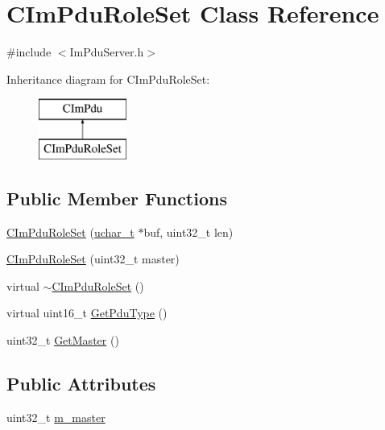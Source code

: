 \hypertarget{class_c_im_pdu_role_set}{}\section{C\+Im\+Pdu\+Role\+Set Class Reference}
\label{class_c_im_pdu_role_set}


{\ttfamily \#include $<$Im\+Pdu\+Server.\+h$>$}

Inheritance diagram for C\+Im\+Pdu\+Role\+Set\+:\begin{figure}[H]
\begin{center}
\leavevmode
\includegraphics[height=2.000000cm]{class_c_im_pdu_role_set}
\end{center}
\end{figure}
\subsection*{Public Member Functions}
\begin{DoxyCompactItemize}
\item 
\hyperlink{class_c_im_pdu_role_set_a655c05fcdb312a7a8eaa40f53d5ac50b}{C\+Im\+Pdu\+Role\+Set} (\hyperlink{base_2ostype_8h_a124ea0f8f4a23a0a286b5582137f0b8d}{uchar\+\_\+t} $\ast$buf, uint32\+\_\+t len)
\item 
\hyperlink{class_c_im_pdu_role_set_a15e7bed68f67ade90bf01f825abdca46}{C\+Im\+Pdu\+Role\+Set} (uint32\+\_\+t master)
\item 
virtual \hyperlink{class_c_im_pdu_role_set_a1e1df3d5ece4df848d408e66b5e06ec0}{$\sim$\+C\+Im\+Pdu\+Role\+Set} ()
\item 
virtual uint16\+\_\+t \hyperlink{class_c_im_pdu_role_set_a2dd2730fc6865a43c51f16eaa757982c}{Get\+Pdu\+Type} ()
\item 
uint32\+\_\+t \hyperlink{class_c_im_pdu_role_set_a267d8d194673988a9b7b959f5d213dfa}{Get\+Master} ()
\end{DoxyCompactItemize}
\subsection*{Public Attributes}
\begin{DoxyCompactItemize}
\item 
uint32\+\_\+t \hyperlink{class_c_im_pdu_role_set_a773905519e63190957189be7f827b0f6}{m\+\_\+master}
\end{DoxyCompactItemize}
